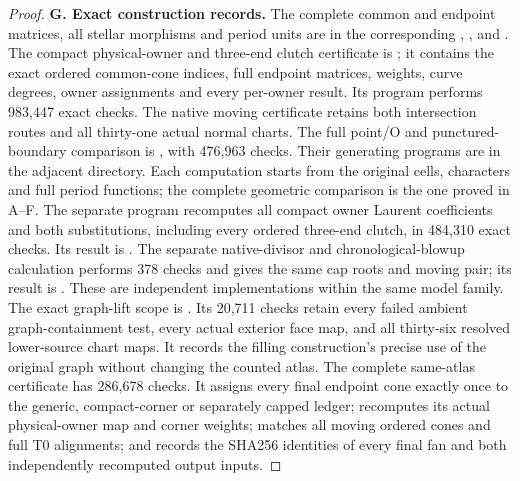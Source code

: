 \begin{proof}
\medskip\noindent\textbf{G. Exact construction records.}
The complete common and endpoint matrices, all stellar morphisms and
period units are in the corresponding
,
,
 and
.
The compact physical-owner and three-end clutch certificate is
; it
contains the exact ordered common-cone indices, full endpoint matrices,
weights, curve degrees, owner assignments and every per-owner result.
Its program performs 983,447 exact checks.  The native moving certificate
 retains both
intersection routes and all thirty-one actual normal charts.  The full
point/O and punctured-boundary comparison is
,
with 476,963 checks.  Their generating programs are in the adjacent
 directory.  Each computation starts from the original cells,
characters and full period functions; the complete geometric comparison
is the one proved in A--F.
The separate program
 recomputes all compact
owner Laurent coefficients and both substitutions, including every
ordered three-end clutch, in 484,310 exact checks.  Its result is
.
The separate native-divisor and chronological-blowup calculation
 performs 378 checks and
gives the same cap roots and moving pair; its result is
.
These are independent implementations within the same model family.
The exact graph-lift scope is
.
Its 20,711 checks retain every failed ambient graph-containment test,
every actual exterior face map, and all thirty-six resolved lower-source
chart maps.  It records the filling construction's precise use of the
original graph without changing the counted atlas.
The complete same-atlas certificate
 has
286,678 checks.  It assigns every final endpoint cone exactly once to
the generic, compact-corner or separately capped ledger; recomputes
its actual physical-owner map and corner weights; matches all moving
ordered cones and full T0 alignments; and records the SHA256 identities
of every final fan and both independently recomputed output inputs.

\end{proof}
